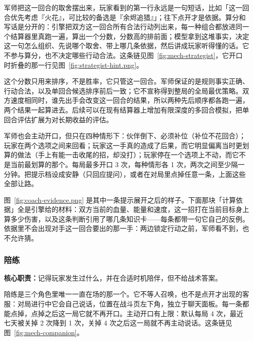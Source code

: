 军师把这一回合的取舍摆出来，玩家看到的第一行永远是一句短话，比如「这一回合优先考虑『火花』，可比较的备选是『余烬追猎』」；往下点开才是依据。算分和写话是分开的：引擎把双方这一回合所有合法行动列出来，每一种组合都放进同一个结算器里真跑一遍，算出一个分数，分数高的排前面；模型拿到这堆事实，决定这一句怎么组织、先说哪个取舍、带上哪几条依据，然后讲成玩家听得懂的话。它不参与算分，也不决定哪些行动合法。这条链见图~\ref{fig:mech-strategist}，它开口时折叠的那一行见图~\ref{fig:strategist-hint.png}。


这个分数只用来排序，不是胜率，它只管这一回合。军师保证的是规则事实正确、行动合法，以及单回合候选排序前后一致；它不宣称得到整局的全局最优策略。双方速度相同时，谁先出手会改变这一回合的结果，所以两种先后顺序都各跑一遍，两个结果一起算进去。后续可以在现有结算器上增加有限深度的多回合模拟，把单回合评估扩展为对长期收益的评估。

军师也会主动开口，但只在四种情形下：伙伴倒下、必须补位（补位不花回合）；玩家在两个选项之间来回看；玩家这一手真的造成了后果，而它明显偏离当时更划算的做法（手上有能一击收尾的招，却没打）；玩家停在一个选项上不动，而它不是当前最划算的那个。每局最多开口 3 次，每种情形各 1 次，两次之间至少隔一分钟。把提示档设成安静（只回应提问），或者在对局里点掉任意一条，上面这些全部让路。


图~\ref{fig:coach-evidence.png} 是其中一条提示展开之后的样子。下面那块「计算依据」全是引擎给的材料：双方当前的血量、能量和速度，这一招打在当前目标身上算多少伤害，以及这条判断引用了哪几条知识卡——每条都带一句它自己的反例。依据里不会出现对手这一回合要出的那一手：两边锁定行动之前，军师看不到，也不允许猜。

\subsubsection{陪练}

\noindent\textbf{核心职责：}记得玩家发生过什么，并在合适时机陪伴，但不给战术答案。\par\vspace{0.15em}



陪练是三个角色里唯一一直在场的那一个。它不等人召唤，也不是点开才出现的客服：对局进行中它会自己说话，位置在战斗页左下角，独立于聊天面板。每一条都能点掉，点掉之后这一局它就不再开口。主动开口有上限：默认每局 4 次，最近七天被关掉 2 次降到 1 次，关掉 4 次之后这一局就不再主动说话。这条链见图~\ref{fig:mech-companion}。

